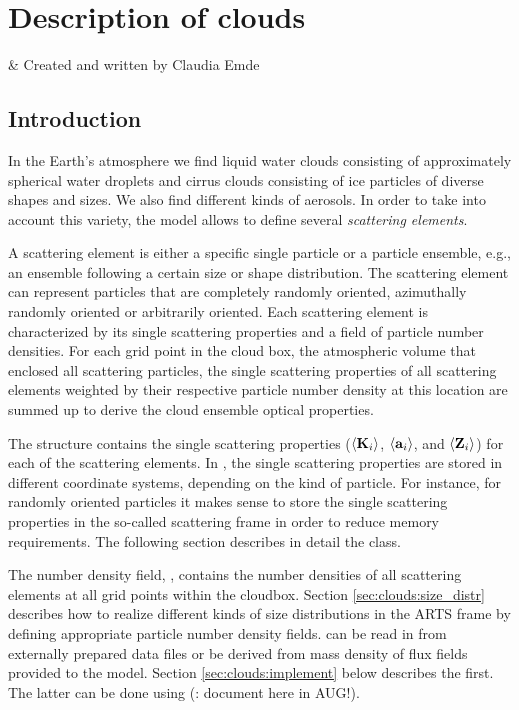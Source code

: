 \graphicspath{{Figs/clouds/}}

\chapter{Description of clouds}
 \label{sec:clouds}

 & Created and written by Claudia Emde\\ 
\stophistory

\section{Introduction}
\label{sec:clouds:intro}

In the Earth's atmosphere we find liquid water clouds consisting of
approximately spherical water droplets and cirrus clouds consisting of
ice particles of diverse shapes and sizes. We also find different
kinds of aerosols. In order to take into account this variety, the
model allows to define several \emph{scattering elements}.

A scattering element is either a specific single particle or a particle
ensemble, e.g., an ensemble following a certain size or shape distribution. The
scattering element can represent particles that are completely randomly
oriented, azimuthally randomly oriented or arbitrarily oriented. Each scattering
element is characterized by its single scattering properties and a field of
particle number densities.
For each grid point in the cloud box, the atmospheric volume that enclosed all
scattering particles, the single scattering properties of all scattering
elements weighted by their respective particle number density at this location
are summed up to derive the cloud ensemble optical properties.

The  structure contains the single scattering properties
($\langle{\bf K}_i\rangle$, $\langle{\bf a}_i\rangle$, and
$\langle{\bf Z}_i\rangle$) for each of the scattering elements. 
In , the single scattering properties are stored in
different coordinate systems, depending on the kind of particle. For instance, for
randomly oriented particles it makes sense to store the single scattering
properties in the so-called scattering frame in order to reduce memory
requirements. The following section describes in detail the
 class.

The number density field, , contains the number densities
of all scattering elements at all grid points within the cloudbox. Section
\ref{sec:clouds:size_distr} describes how to realize different kinds of size
distributions in the ARTS frame by defining appropriate particle number density
fields.  can be read in from externally prepared data
files or be derived from mass density of flux fields provided to the model.
Section \ref{sec:clouds:implement} below describes the first. The latter can be
done using  (\FIXME: document
here in AUG!).


